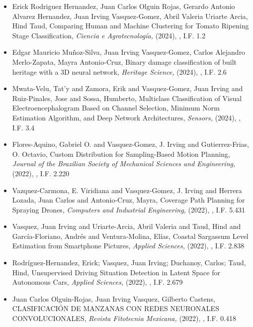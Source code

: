 \begin{itemize} 
\item Erick Rodriguez Hernandez, Juan Carlos Olguin Rojas, Gerardo Antonio Alvarez Hernandez, Juan Irving Vasquez-Gomez, Abril Valeria Uriarte Arcia, Hind Taud, Comparing Human and Machine Clustering for Tomato Ripening Stage Classification,\textit{ Ciencia e Agrotecnología,} (2024), \href{https://doi.org/10.1590/1413-7054202448019123} {\faFilePdfO}, I.F. 1.2 
\item Edgar Mauricio Mu\~noz-Silva, Juan Irving Vasquez-Gomez, Carlos Alejandro Merlo-Zapata, Mayra Antonio-Cruz, Binary damage classification of built heritage with a 3D neural network,\textit{ Heritage Science,} (2024), \href{} {\faFilePdfO}, I.F. 2.6 
\item Mwata-Velu, Tat’y and Zamora, Erik and Vasquez-Gomez, Juan Irving and Ruiz-Pinales, Jose and Sossa, Humberto, Multiclass Classification of Visual Electroencephalogram Based on Channel Selection, Minimum Norm Estimation Algorithm, and Deep Network Architectures,\textit{ Sensors,} (2024), \href{https://doi.org/10.3390/s24123968} {\faFilePdfO}, I.F. 3.4 
\item Flores-Aquino, Gabriel O. and Vasquez-Gomez, J. Irving and Gutierrez-Frias, O. Octavio, Custom Distribution for Sampling-Based Motion Planning,\textit{ Journal of the Brazilian Society of Mechanical Sciences and Engineering,} (2022), \href{https://doi.org/10.1007/s40430-022-03379-0} {\faFilePdfO}, I.F. 2.220 
\item Vazquez-Carmona, E. Viridiana and Vasquez-Gomez, J. Irving and Herrera Lozada, Juan Carlos and Antonio-Cruz, Mayra, Coverage Path Planning for Spraying Drones,\textit{ Computers and Industrial Engineering,} (2022), \href{https://doi.org/10.1016/j.cie.2022.108125} {\faFilePdfO}, I.F. 5.431 
\item Vasquez, Juan Irving and Uriarte-Arcia, Abril Valeria and Taud, Hind and García-Floriano, Andrés and Ventura-Molina, Elías, Coastal Sargassum Level Estimation from Smartphone Pictures,\textit{ Applied Sciences,} (2022), \href{https://doi.org/10.3390/app121910012} {\faFilePdfO}, I.F. 2.838 
\item Rodríguez-Hernandez, Erick; Vasquez, Juan Irving; Duchanoy, Carlos; Taud, Hind, Unsupervised Driving Situation Detection in Latent Space for Autonomous Cars,\textit{ Applied Sciences,} (2022), \href{https://doi.org/10.3390/app12073635} {\faFilePdfO}, I.F. 2.679 
\item Juan Carlos Olguin-Rojas, Juan Irving Vasquez, Gilberto Castens, CLASIFICACIÓN DE MANZANAS CON REDES NEURONALES CONVOLUCIONALES,\textit{ Revista Fitotecnia Mexicana,} (2022), \href{https://doi.org/10.35196/rfm.2022.3.369} {\faFilePdfO}, I.F. 0.418 

\end{itemize}
